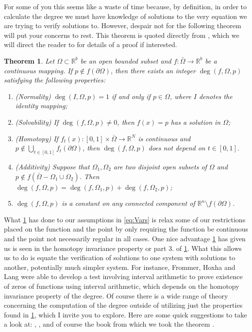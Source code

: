 \documentclass[11pt]{article}
\theoremstyle{plain}
\newtheorem{thm}{Theorem}[section]
\theoremstyle{definition}
\theoremstyle{remark}
\begin{document}
For some of you this seems like a waste of time because, by definition, in order to calculate the degree we must have knowledge of solutions to the very equation we are trying to verify solutions to. However, despair not for the following theorem will put your concerns to rest. 
This theorem is quoted directly from \cite{OrChCh2006}, which we will direct the reader to for details of a proof if interested. 

\begin{thm} \label{DegThm}
Let $\Omega\subset\mathbb{R}^b$ be an open bounded subset and $f:\bar{\Omega}\rightarrow\mathbb{R}^b$ be a continuous mapping. If $p\not\in f\left(\partial\Omega\right)$, then there exists an integer $\operatorname{deg}\left(f, \Omega,p\right)$ satisfying the following properties:
\begin{enumerate}
\item (Normality) $\operatorname{deg}\left(I, \Omega,p\right)=1$ if and only if $p\in\Omega$, where $I$ denotes the identity mapping;
\item (Solvability) If $\operatorname{deg}\left(f, \Omega,p\right)\not= 0$, then $f(x)=p$ has a solution in $\Omega$;
\item (Homotopy) If $f_t(x):[0,1]\times\bar{\Omega}\rightarrow\mathbb{R}^N$ is continuous and $p\not\in \bigcup\limits_{t\in[0,1]}f_t\left(\partial\Omega\right)$, then $\operatorname{deg}\left(f, \Omega,p\right)$ does not depend on $t\in[0,1]$. 
\item (Additivity) Suppose that $\Omega_1, \Omega_2$ are two disjoint open subsets of $\Omega$ and $p\not\in f\left(\bar{\Omega}-\Omega_1\cup\Omega_2\right)$. Then $\operatorname{deg}\left(f, \Omega,p\right)=\operatorname{deg}\left(f, \Omega_1,p\right)+\operatorname{deg}\left(f, \Omega_2,p\right)$;
\item $\operatorname{deg}\left(f, \Omega,p\right)$ is a constant on any connected component of $\mathbb{R}^n\setminus f(\partial\Omega)$. 
\end{enumerate}
\end{thm}

What \cref{DegThm} has done to our assumptions in \eqref{eq:Vars} is relax some of our restrictions placed on the function and the point by only requiring the function be continuous and the point not necessarily regular in all cases. One nice advantage \cref{DegThm} has given us is seen in the homotopy invariance property or part 3. of \cref{DegThm}. What this allows us to do is equate the verification of solutions to one system with solutions to another, potentially much simpler system. For instance, Frommer, Hoxha and Lang were able to develop a test involving interval arithmetic to prove existence of zeros of functions using interval arithmetic, which depends on the homotopy invariance property of the degree. \cite{FrHoLa2007} Of course there is a wide range of theory concerning the computation of the degree outside of utilizing just the properties found in \cref{DegThm}, which I invite you to explore. Here are some quick suggestions to take a look at: \cite{MoVrYa2002}, \cite{OnTh2006}, and of course the book from which we took the theorem \cite{OrChCh2006}.


\end{document}

